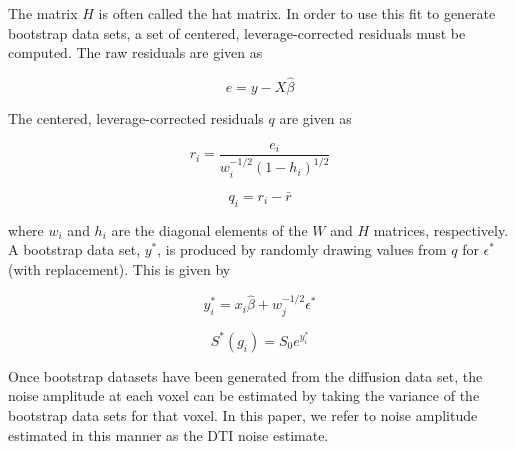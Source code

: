 The matrix $H$ is often called the hat matrix. In order to use this fit to
generate bootstrap data sets, a set of centered, leverage-corrected
residuals must be computed. The raw residuals are given as

\begin{equation}
e = y - X\hat{\beta}
\end{equation}

The centered, leverage-corrected residuals $q$ are given as

\begin{equation}
r_i = \frac{e_i}{w_i^{-1/2}(1-h_i)^{1/2}}
\end{equation}

\begin{equation}
q_i = r_i - \bar{r}
\end{equation}

where $w_i$ and $h_i$ are the diagonal elements of the $W$ and $H$ matrices, respectively. A bootstrap data set, $y^*$, is produced by randomly drawing values from $q$ for $\epsilon^*$ (with replacement). This is given by

\begin{equation}
y^*_i = x_i\hat{\beta} + w_j^{-1/2}\epsilon^*
\end{equation}

\begin{equation}
S^*(g_i) = S_0e^{y_i^*}
\end{equation}

Once bootstrap datasets have been generated from the diffusion data set,
the noise amplitude at each voxel can be estimated by taking the
variance of the bootstrap data sets for that voxel. In this paper, we
refer to noise amplitude estimated in this manner as the DTI noise
estimate.